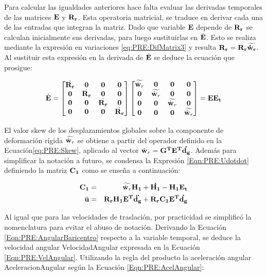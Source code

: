 Para calcular las igualdades anteriores hace falta evaluar las derivadas temporales de las matrices $\bf{E}$ y $\bf{R}_r$. Esta operatoria matricial, se traduce en derivar cada una de las entradas que integran la matriz. Dado que variable $\bf{E}$ depende de $\bf{R}_r$ se calculan inicialmente sus derivadas, para luego sustituirlas en $\dot{\bf{E}}$. Esto se realiza mediante la expresión en variaciones \eqref{eq:PRE:DifMatrix3} y resulta $\bf{R}_r=\bf{R_r}\widetilde{\dot{\bf{w}}_r}$. Al sustituir esta expresión en la derivada de $\dot{\bf{E}}$ se deduce la ecuación que prosigue:

\begin{equation}
\dot{\bf{E}}=\begin{bmatrix}
	\dot{\bf{R}_r} & \bf{0} & \bf{0} & \bf{0} \\ 
	\bf{0}&\dot{\bf{R}_r}  & \bf{0} & \bf{0}\\ 
	\bf{0}& \bf{0} & \dot{\bf{R}_r} & \bf{0}\\ 
	\bf{0}& \bf{0} & \bf{0} & \dot{\bf{R}_r}
\end{bmatrix}\begin{bmatrix}
	\widetilde{\dot{\bf{w}}_r} & \bf{0} & \bf{0} & \bf{0} \\ 
	\bf{0}& \widetilde{\dot{\bf{w}}_r}  & \bf{0} & \bf{0}\\ 
	\bf{0}& \bf{0} & \widetilde{\dot{\bf{w}}_r} & \bf{0}\\ 
	\bf{0}& \bf{0} & \bf{0} & \widetilde{\dot{\bf{w}}_r}
\end{bmatrix}=\bf{E}\bf{E}_t
\end{equation}

El valor skew de los desplazamientos globales sobre la componente de deformación rígida $\widetilde{\dot{\bf{w}}_r}$ se obtiene a partir del operador definido en la Ecuación\eqref{eq:PRE:Skew}, aplicado al vector $\dot{\bf{w}}_r=\bf{G}^T\bf{E}^T\dot{\bf{d}_g}$. Además para simplificar la notación a futuro, se condensa la Expresión \eqref{Eqn:PRE:Udotdot} definiendo la matriz $\bf{C}_1$ como se enseña a continuación:

\begin{eqnarray}
	\label{Eqn:PRE:DefC1}
    \bf{C}_1 &=& \widetilde{\dot{\bf{w}}_r}\bf{H_1}+\dot{\bf{H}_1}-\bf{H}_1\bf{E}_t\\
    \label{Eqn:PRE:UdotdotC1}
    \ddot{\bf{u}} &=&\bf{R}_r\bf{H}_1\bf{E}^T\ddot{{d}_g}+\bf{R}_r\bf{C}_1\bf{E}^T\dot{{d}_g}
\end{eqnarray}

Al igual que para las velocidades de traslación, por practicidad se simplificó la nomenclatura para evitar el abuso de notación. Derivando la Ecuación \eqref{Eqn:PRE:AngularBaricentro} respecto a la variable temporal, se deduce la velocidad angular \gls{VelocidadAngular} expresada en la Ecuación \eqref{Eqn:PRE:VelAngular}. Utilizando la regla del producto la aceleración angular  \gls{AceleracionAngular} según la Ecuación \eqref{Eqn:PRE:AcelAngular}: 

